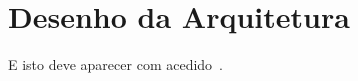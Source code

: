 \chapter{Desenho da Arquitetura}\label{chap:syst}
\lipsum

E isto deve aparecer com acedido~\cite{urlLinkTest}.

